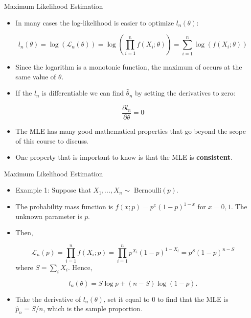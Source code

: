 \documentclass[handout]{beamer}
\begin{document}
\begin{frame}{Maximum Likelihood Estimation}
\scriptsize{
\begin{itemize}
 \item In many cases the log-likelihood is easier to optimize $l_n(\theta)$:
 
 \begin{displaymath}
l_n(\theta) = \log(\mathcal{L}_{n}(\theta))=\log(\prod_{i=1}^nf(X_i;\theta))= \sum_{i=1}^{n}\log(f(X_i;\theta))  
 \end{displaymath} 

\item Since the logarithm is a monotonic function, the maximum of occurs at the same value of $\theta$.
 
\item If the $l_n$ is differentiable we can find   $\hat{\theta}_n$ by setting the derivatives to zero:

\begin{displaymath}
 \frac{\partial l_n}{\partial \theta} = 0
\end{displaymath}

\item The MLE has many good mathematical properties that go beyond the scope of this course to discuss.

\item One property that is important to know is that the MLE is \textbf{consistent}.

\end{itemize}


} 
 
\end{frame}


\begin{frame}{Maximum Likelihood Estimation}
\scriptsize{
\begin{itemize}
 \item Example 1: Suppose that $X_1,\dots, X_n \sim$  Bernoulli$(p)$. 
 \item The probability mass function is $f(x;p)= p^x(1- p)^{1-x}$ for $x = 0,1$. The unknown parameter is $p$. 
 \item Then,
 
 \begin{displaymath}
\mathcal{L}_{n}(p)=\prod_{i=1}^nf(X_i;p) = \prod_{i=1}^np^{X_i}(1-p)^{1-X_i}=p^S(1-p)^{n-S} 
 \end{displaymath} 
where $S=\sum_{i}X_i$. Hence, 
 
 \begin{displaymath}
l_n(\theta) = S\log p+ (n-S)\log(1-p). 
 \end{displaymath}  
 
\item Take the derivative of $l_n(\theta)$, set it equal to 0 to find that the MLE is $\hat{p}_n =S/n$, which is the sample proportion.
 
\end{itemize}


} 
 
\end{frame}
\end{document}
